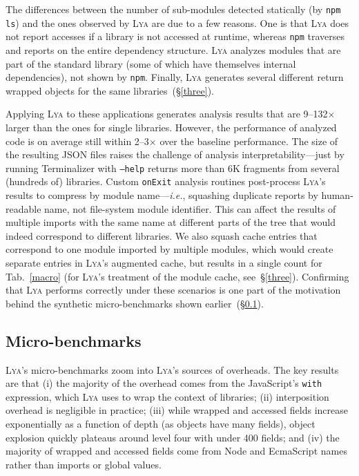 \documentclass[letterpaper,twocolumn,10pt]{article}
\def\ie{{\em i.e.}, }
\newcommand{\ttt}[1]{\texttt{#1}}
\newcommand{\sx}[1]{(\S\ref{#1})}
\newcommand{\sys}{{\scshape Lya}\xspace}
\begin{document}
The differences between the number of sub-modules detected statically (by \ttt{npm ls}) and the ones observed by \sys are due to a few reasons.
One is that \sys does not report accesses if a library is not accessed at runtime, whereas \ttt{npm} traverses and reports on the entire dependency structure.
\sys analyzes modules that are part of the standard library (some of which have themselves internal dependencies),  not shown by \ttt{npm}.
Finally, \sys generates several different return wrapped objects for the same libraries~\sx{three}.

Applying \sys to these applications generates analysis results that are 9--132$\times$ larger than the ones for single libraries.
However, the performance of analyzed code is on average still within 2--3$\times$ over the baseline performance.
The size of the resulting JSON files raises the challenge of analysis interpretability---just by running Terminalizer with \ttt{--help} returns more than 6K fragments from several (hundreds of) libraries.
Custom \ttt{onExit} analysis routines post-process \sys's results to compress by module name---\ie squashing duplicate reports by human-readable name, not file-system module identifier.
This can affect the results of multiple imports with the same name at different parts of the tree that would indeed correspond to different libraries.
We also squash cache entries that correspond to one module imported by multiple modules, which would create separate entries in \sys's augmented cache, but results in a single count for Tab.~\ref{macro} (for \sys's treatment of the module cache, see~\S\ref{three}).
Confirming that \sys performs correctly under these scenarios is one part of the motivation behind the synthetic micro-benchmarks shown earlier~\sx{micro}.

\subsection{Micro-benchmarks}
\label{micro}


\sys's micro-benchmarks zoom into \sys's sources of overheads.
The key results are that
  (i) the majority of the overhead comes from the JavaScript's \ttt{with} expression, which \sys uses to wrap the context of libraries;
  (ii) interposition overhead is negligible in practice;
  (iii) while wrapped and accessed fields increase exponentially as a function of depth (as objects have many fields), object explosion quickly plateaus around level four with under 400 fields; and
  (iv) the majority of wrapped and accessed fields come from Node and EcmaScript names rather than imports or global values.
\end{document}
